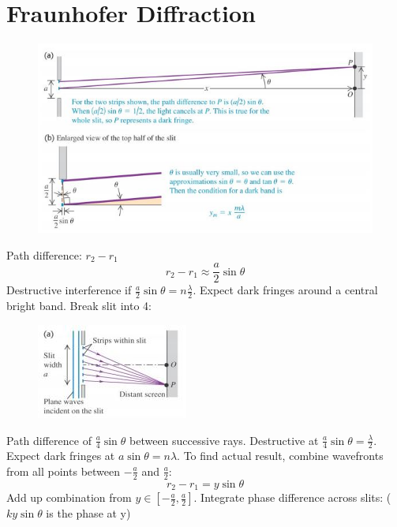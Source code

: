 \documentclass[a4paper, 11pt, normalem]{report}
\begin{document}
\section{Fraunhofer Diffraction}
\begin{figure}[H]
    \centering
    \includegraphics{Fraunhofer.jpg}
\end{figure}
Path difference: $r_{2} - r_{1}$
\begin{equation}
    r_{2} - r_{1} \approx \frac{a}{2}\sin{\theta}
\end{equation}
Destructive interference if $\frac{a}{2}\sin{\theta} = n\frac{\lambda}{2}$.
Expect dark fringes around a central bright band.
Break slit into 4:
\begin{figure}[H]
    \centering
    \includegraphics[scale=1.6]{Diffrac1.jpg}
\end{figure}
Path difference of $\frac{a}{4}\sin{\theta}$ between successive rays.
Destructive at $\frac{a}{4}\sin{\theta} = \frac{\lambda}{2}$.
Expect dark fringes at $a\sin{\theta} = n\lambda$.
To find actual result, combine wavefronts from all points between $-\frac{a}{2}$ and $\frac{a}{2}$:
\begin{equation}
    r_{2} - r_{1} = y\sin{\theta}
\end{equation}
Add up combination from $y \in {[{-\frac{a}{2}},\frac{a}{2}]}$.
Integrate phase difference across slits:
($ky\sin{\theta}$ is the phase at y)
\end{document}

